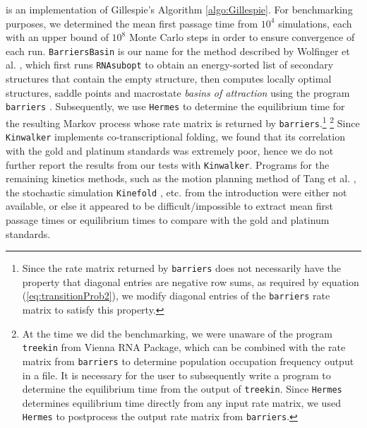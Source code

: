 \kinfold \cite{flamm} is an implementation of Gillespie's
Algorithm \ref{algo:Gillespie}.
For benchmarking purposes, we determined the mean first passage time
from $10^4$ \kinfold simulations, each with an upper bound of
$10^8$ Monte Carlo steps in order to ensure convergence of each run.
{\tt BarriersBasin} is our name for the method described by Wolfinger
et al. \cite{wolfingerStadler:kinetics}, which first runs
{\tt RNAsubopt} \cite{flammHofacker} to obtain an energy-sorted list of
secondary structures that contain the empty structure,
then computes locally optimal structures, saddle points and macrostate
{\em basins of attraction}  using the program {\tt barriers}
\cite{wolfingerStadler:kinetics}. Subsequently, we use {\tt Hermes} to
determine the equilibrium time for the resulting Markov process whose
rate matrix is returned by {\tt barriers}.\footnote{Since
the rate matrix returned by {\tt barriers}
does not necessarily have the property that diagonal entries are negative
row sums, as required by equation (\ref{eq:transitionProb2}), we modify
diagonal entries of the {\tt barriers} rate matrix to satisfy this property.}
\footnote{At the time we did the benchmarking, we were unaware of the
program {\tt treekin} from Vienna RNA Package, which can be combined with
the rate matrix from {\tt barriers} to determine population occupation
frequency output in a file. It is necessary for the user to subsequently
write a program to determine the equilibrium time from the output of
{\tt treekin}. Since {\tt Hermes} determines equilibrium time directly
from any input rate matrix, we used {\tt Hermes} to postprocess the
output rate matrix from {\tt barriers}.}
Since {\tt Kinwalker} \cite{Geis.jmb08} implements co-transcriptional folding,
we found that its correlation with the gold and platinum standards was
extremely poor, hence we do not further report the results from our tests
with {\tt Kinwalker}.
Programs for the remaining kinetics methods, such as the motion planning
method of Tang et al. \cite{Tang.jmb08}, the stochastic simulation
{\tt Kinefold} \cite{Xayaphoummine.nar05}, etc.
from the introduction were either not available, or else it
appeared to be difficult/impossible to extract
mean first passage times or equilibrium times to compare with the
gold and platinum standards.


